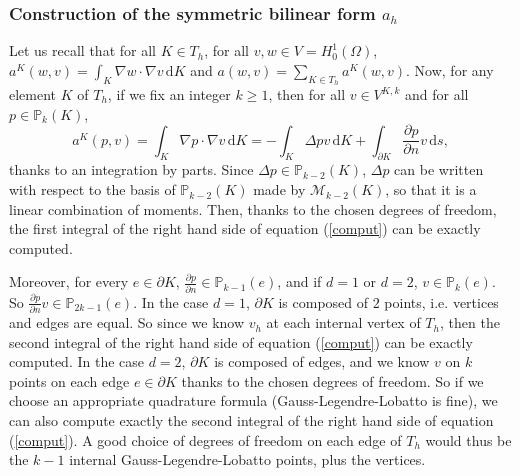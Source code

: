 \subsubsection{Construction of the symmetric bilinear form $a_h$}
Let us recall that for all $K\in T_h$, for all $v,w\in V=H_0^1(\Omega)$, $a^K(w,v)= \int_K \nabla w \cdot \nabla v \, \mathrm{d}K$ and $a(w,v)=\sum_{K\in T_h} a^K(w,v)$. Now, for any element $K$ of $T_h$, if we fix an integer $k\geq 1$, then for all $v\in V^{K,k}$ and for all $p\in \mathbb{P}_k(K)$, 
\begin{equation}\label{comput}
a^K(p,v)= \int_K \nabla p \cdot \nabla v \, \mathrm{d}K = - \int_K \Delta p v \, \mathrm{d}K +  \int_{\partial K} \frac{\partial p}{\partial n} v \, \mathrm{d}s,
\end{equation}
thanks to an integration by parts.
Since $\Delta p\in \mathbb{P}_{k-2}(K)$, $\Delta p$ can be written with respect to the basis of $\mathbb{P}_{k-2}(K)$ made by $\mathcal{M}_{k-2}(K)$, so that it is a linear combination of moments. Then, thanks to the chosen degrees of freedom, the first integral of the right hand side of equation (\ref{comput}) can be exactly computed. 

Moreover, for every $e\in\partial K$, $\frac{\partial p}{\partial n}\in \mathbb{P}_{k-1}(e)$, and if $d=1$ or $d=2$, $v\in \mathbb{P}_k(e)$. So $\frac{\partial p}{\partial n}v\in \mathbb{P}_{2k-1}(e)$. In the case $d=1$, $\partial K$ is composed of $2$ points, i.e. vertices and edges are equal. So since we know $v_h$ at each internal vertex of $T_h$, then the second integral of the right hand side of equation (\ref{comput}) can be exactly computed. In the case $d=2$, $\partial K$ is composed of edges, and we know $v$ on $k$ points on each edge $e\in\partial K$ thanks to the chosen degrees of freedom. So if we choose an appropriate quadrature formula (Gauss-Legendre-Lobatto is fine), we can also compute exactly the second integral of the right hand side of equation (\ref{comput}). A good choice of degrees of freedom on each edge of $T_h$ would thus be the $k-1$ internal Gauss-Legendre-Lobatto points, plus the vertices. 

